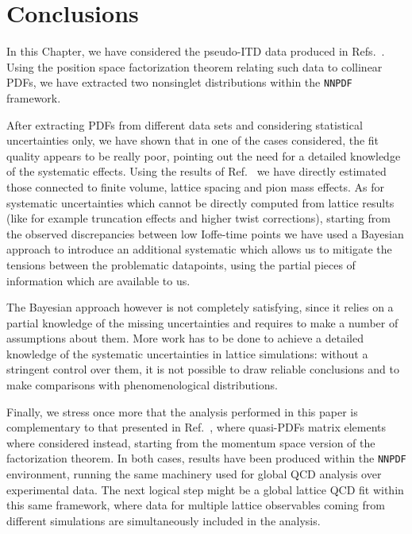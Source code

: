 \section{Conclusions}
\label{sec:conclusions}
In this Chapter,
we have considered the pseudo-ITD data produced in Refs.~\cite{Joo:2019jct,Joo:2020spy}. Using the
position space factorization theorem relating such data to collinear PDFs, we have extracted two nonsinglet distributions 
within the {\tt NNPDF} framework. 

%
After extracting PDFs from different data sets and 
considering statistical uncertainties only, 
we have shown that in one of the cases considered, the fit quality appears to be really poor,
pointing out the need for a detailed knowledge of the systematic effects.
Using the results of Ref.~\cite{Joo:2019jct,Joo:2020spy} we have directly estimated those connected to finite volume, lattice spacing
and pion mass effects. As for systematic uncertainties which cannot be directly computed from lattice results (like
for example truncation effects and higher twist corrections), starting from
the observed discrepancies between low Ioffe-time points we have used a Bayesian approach to introduce an additional systematic 
which allows us to mitigate the tensions between the problematic datapoints, using the partial pieces of information which are available to us.

%
The Bayesian approach however is not completely satisfying, since it relies on a partial knowledge of the
missing uncertainties and requires to make a number of assumptions about them. More work has to be done
to achieve a detailed knowledge of the systematic uncertainties in lattice simulations: 
without a stringent control over them, it is not possible to draw reliable conclusions and
to make comparisons with phenomenological distributions. 

%
Finally, we stress once more that the analysis performed in this paper is complementary to that 
presented in Ref.~\cite{Cichy2019}, where quasi-PDFs matrix elements where considered instead, 
starting from the momentum space version of the factorization theorem. 
In both cases, results have been produced within the {\tt NNPDF} environment,
running the same machinery used for global QCD analysis over experimental data. 
The next logical step might be a global lattice QCD fit within this same framework, where data for multiple lattice observables 
coming from different simulations are simultaneously included in the analysis.